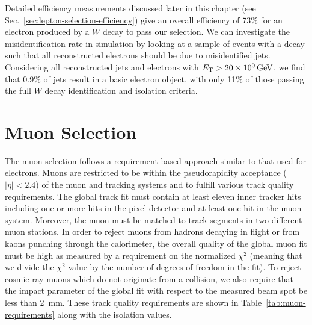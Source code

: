 Detailed efficiency measurements discussed later in this chapter (see Sec.~\ref{sec:lepton-selection-efficiency}) give an overall efficiency of 73\% for an electron produced by a $W$ decay to pass our selection.  
We can investigate the misidentification rate in simulation by looking at a sample of \Zjets{} events with a \ztomumu{} decay such that all reconstructed electrons should be due to misidentified jets.  Considering all reconstructed jets and electrons with $\et > \sienergy{20}$, we find that 0.9\% of jets result in a basic electron object, with only 11\% of those passing the full $W$ decay identification and isolation criteria. 


\section{Muon Selection}
\label{sec:muon-selection}
The muon selection follows a requirement-based approach similar to that used for electrons.  Muons are restricted to be within the pseudorapidity acceptance ($|\eta| < 2.4$) of the muon and tracking systems and to fulfill various track quality requirements.  The global track fit must contain at least eleven inner tracker hits including one or more hits in the pixel detector and at least one hit in the muon system.  Moreover, the muon must be matched to track segments in two different muon stations.  In order to reject muons from hadrons decaying in flight or from kaons punching through the calorimeter, the overall quality of the global muon fit must be high as measured by a requirement on the normalized $\chi^2$ (meaning that we divide the $\chi^2$ value by the number of degrees of freedom in the fit).  To reject cosmic ray muons which do not originate from a collision, we also require that the impact parameter of the global fit with respect to the measured beam spot be less than \SI{2}{mm}.  These track quality requirements are shown in Table~\ref{tab:muon-requirements} along with the isolation values.

